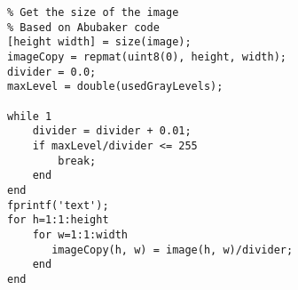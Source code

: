 

\begin{verbatim}
% Get the size of the image
% Based on Abubaker code
[height width] = size(image);
imageCopy = repmat(uint8(0), height, width);
divider = 0.0;
maxLevel = double(usedGrayLevels);

while 1
    divider = divider + 0.01;
    if maxLevel/divider <= 255
        break;
    end
end
fprintf('text');
for h=1:1:height
    for w=1:1:width
       imageCopy(h, w) = image(h, w)/divider;
    end
end
\end{verbatim}




